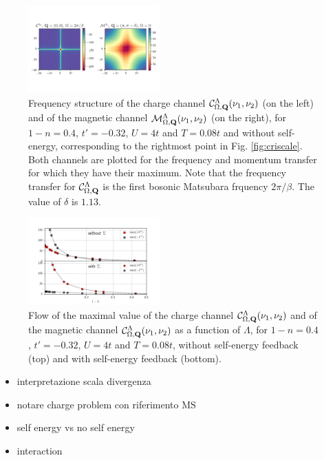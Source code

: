 \begin{figure}
\includegraphics[width=0.45\textwidth]{images/Phi_color_NOSE_fill0600.png}
\caption{Frequency structure of the charge channel $\mathcal{C}^\Lambda_{\Omega,\mathbf{Q}}(\nu_1,\nu_2)$ (on the left) and of the magnetic channel $\mathcal{M}^\Lambda_{\Omega,\mathbf{Q}}(\nu_1,\nu_2)$ (on the right), for $1-n=0.4$, $t'=-0.32$, $U=4t$ and $T=0.08t$ and without self-energy, corresponding to the rightmost point in Fig. \ref{fig:criscale}. 
Both channels are plotted for the frequency and momentum transfer for which they have their maximum. Note that the frequency transfer for $\mathcal{C}^\Lambda_{\Omega,\mathbf{Q}}$ is the first bosonic Matsubara frquency $2\pi/\beta$. 
The value of $\delta$ is $1.13$.  
 }  
\label{fig:freqplot} 
\end{figure}
\begin{figure}
\includegraphics[width=0.45\textwidth]{images/chargeproblem.png}
\caption{Flow of the maximal value of the charge channel $\mathcal{C}^\Lambda_{\Omega,\mathbf{Q}}(\nu_1,\nu_2)$ and of the magnetic channel $\mathcal{C}^\Lambda_{\Omega,\mathbf{Q}}(\nu_1,\nu_2)$ as a function of $\Lambda$, for  $1-n=0.4$, $t'=-0.32$, $U=4t$ and $T=0.08t$, without self-energy feedback (top) and with self-energy feedback (bottom). }
\label{fig:chargeproblem}
\end{figure}


\begin{itemize}
\item interpretazione scala divergenza
\item notare charge problem con riferimento MS 
\item self energy vs no self energy
\item interaction  
\end{itemize}   



